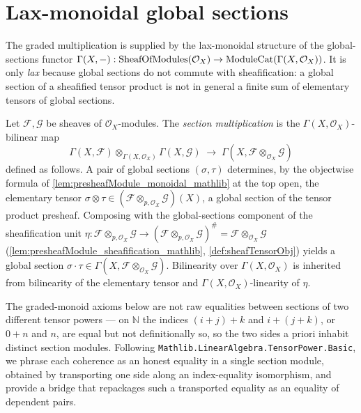 \section{Lax-monoidal global sections}
\label{sec:sgr_lax_sections}

The graded multiplication is supplied by the lax-monoidal structure of the
global-sections functor \(\Gamma(X, -) : \mathrm{SheafOfModules}(\mathcal{O}_X) \to
\mathrm{ModuleCat}(\Gamma(X, \mathcal{O}_X))\). It is only \emph{lax} because
global sections do not commute with sheafification: a global section of a
sheafified tensor product is not in general a finite sum of elementary tensors of
global sections.

\begin{definition}
  \label{def:sectionMul}
  Let \(\mathcal{F}, \mathcal{G}\) be sheaves of \(\mathcal{O}_X\)-modules. The
  \emph{section multiplication} is the \(\Gamma(X,\mathcal{O}_X)\)-bilinear map
  \[
    \Gamma(X, \mathcal{F}) \otimes_{\Gamma(X,\mathcal{O}_X)}
      \Gamma(X, \mathcal{G})
    \;\longrightarrow\;
    \Gamma(X, \mathcal{F} \otimes_{\mathcal{O}_X} \mathcal{G})
  \]
  defined as follows. A pair of global sections \((\sigma, \tau)\) determines,
  by the objectwise formula of \cref{lem:presheafModule_monoidal_mathlib} at the
  top open, the elementary tensor \(\sigma \otimes \tau \in
  (\mathcal{F} \otimes_{p,\mathcal{O}_X} \mathcal{G})(X)\), a global section of
  the tensor product presheaf. Composing with the global-sections component of
  the sheafification unit
  \(\eta : \mathcal{F} \otimes_{p,\mathcal{O}_X} \mathcal{G} \to
  (\mathcal{F} \otimes_{p,\mathcal{O}_X} \mathcal{G})^{\#} =
  \mathcal{F} \otimes_{\mathcal{O}_X} \mathcal{G}\)
  (\cref{lem:presheafModule_sheafification_mathlib},
  \cref{def:sheafTensorObj}) yields a global section
  \(\sigma \cdot \tau \in
  \Gamma(X, \mathcal{F} \otimes_{\mathcal{O}_X} \mathcal{G})\). Bilinearity over
  \(\Gamma(X,\mathcal{O}_X)\) is inherited from bilinearity of the elementary
  tensor and \(\Gamma(X,\mathcal{O}_X)\)-linearity of \(\eta\).
\end{definition}

The graded-monoid axioms below are not raw equalities between sections of two
different tensor powers --- on \(\mathbb{N}\) the indices \((i+j)+k\) and
\(i+(j+k)\), or \(0+n\) and \(n\), are equal but not definitionally so, so the two
sides a priori inhabit distinct section modules. Following
\texttt{Mathlib.LinearAlgebra.TensorPower.Basic}, we phrase each coherence as an
honest equality in a single section module, obtained by transporting one side
along an index-equality isomorphism, and provide a bridge that repackages such a
transported equality as an equality of dependent pairs.

